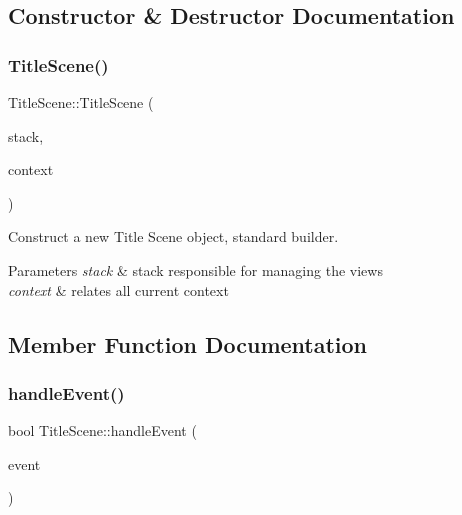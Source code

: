\subsection{Constructor \& Destructor Documentation}
\mbox{\label{classTitleScene_a2542c8d7f2bcd75f69d79ec96cf75859}} 
\subsubsection{\texorpdfstring{Title\+Scene()}{TitleScene()}}
{\footnotesize\ttfamily Title\+Scene\+::\+Title\+Scene (\begin{DoxyParamCaption}\item[{\hyperlink{classStateManager}{State\+Manager} \&}]{stack,  }\item[{\hyperlink{structState_1_1Context}{Context}}]{context }\end{DoxyParamCaption})}



Construct a new Title Scene object, standard builder. 


\begin{DoxyParams}{Parameters}
{\em stack} & stack responsible for managing the views \\
\hline
{\em context} & relates all current context \\
\hline
\end{DoxyParams}


\subsection{Member Function Documentation}
\mbox{\label{classTitleScene_ae965e4a6c1435246fcbdd487bbc58468}} 
\subsubsection{\texorpdfstring{handle\+Event()}{handleEvent()}}
{\footnotesize\ttfamily bool Title\+Scene\+::handle\+Event (\begin{DoxyParamCaption}\item[{const sf\+::\+Event \&}]{event }\end{DoxyParamCaption})\hspace{0.3cm}{\ttfamily [virtual]}}



